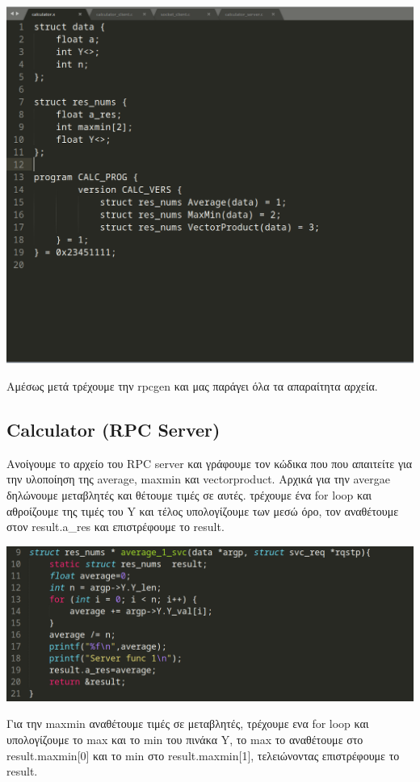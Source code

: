 \begin{center}
			\includegraphics[width=1\textwidth]{image/calc-x.png}		
\end{center}

\noindent
Αμέσως μετά τρέχουμε την rpcgen και μας παράγει όλα τα απαραίτητα αρχεία. 

\subsection{Calculator (RPC Server)}
\noindent
Ανοίγουμε το αρχείο του RPC server
και γράφουμε τον κώδικα που που απαιτείτε για την υλοποίηση της average, maxmin και vectorproduct. Αρχικά για 
την  avergae δηλώνουμε μεταβλητές και θέτουμε τιμές σε αυτές. τρέχουμε ένα for loop και αθροίζουμε της 
τιμές του Y και τέλος υπολογίζουμε των μεσώ όρο, τον αναθέτουμε στον result.a\_res και επιστρέφουμε το result.

\begin{center}
			\includegraphics[width=1\textwidth]{image/average.png}		
\end{center}
\noindent
Για την maxmin αναθέτουμε τιμές σε μεταβλητές, τρέχουμε ενα for loop και υπολογίζουμε το max και το min του πινάκα
Y, το max το αναθέτουμε στο result.maxmin[0] και το min στο result.maxmin[1], τελειώνοντας επιστρέφουμε το result.

